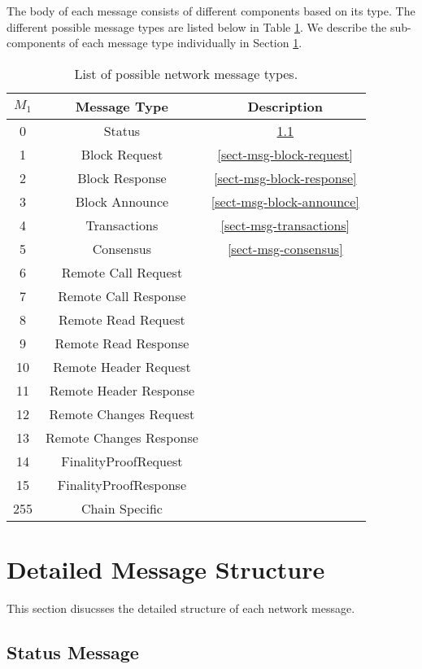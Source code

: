 \documentclass{book}
\begin{document}
The body of each message consists of different components based on its type.
The different possible message types are listed below in Table
\ref{tabl-message-types}. We describe the sub-components of each message type
individually in Section \ref{sect-message-detail}.

\begin{table}[h]
  \begin{tabular}{|c|c|c|}
    \hline
    $M_1$ & Message Type & Description\\
    \hline
    0 & Status & \ref{sect-msg-status}\\
    1 & Block Request & \ref{sect-msg-block-request}\\
    2 & Block Response & \ref{sect-msg-block-response}\\
    3 & Block Announce & \ref{sect-msg-block-announce}\\
    4 & Transactions & \ref{sect-msg-transactions}\\
    5 & Consensus & \ref{sect-msg-consensus}\\
    6 & Remote Call Request & \\
    7 & Remote Call Response & \\
    8 & Remote Read Request & \\
    9 & Remote Read Response & \\
    10 & Remote Header Request & \\
    11 & Remote Header Response & \\
    12 & Remote Changes Request & \\
    13 & Remote Changes Response & \\
    14 & FinalityProofRequest & \\
    15 & FinalityProofResponse & \\
    255 & Chain Specific & \\
    \hline
  \end{tabular}
  \caption{\label{tabl-message-types}List of possible network message types.}
\end{table}

\section{Detailed Message Structure}\label{sect-message-detail}

This section disucsses the detailed structure of each network message.

\subsection{Status Message}\label{sect-msg-status}
\end{document}
